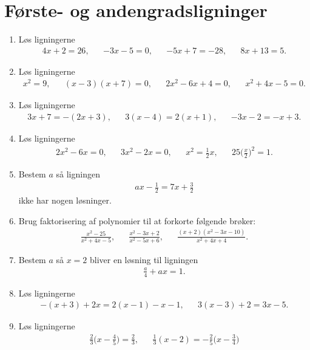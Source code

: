 \section{Første- og andengradsligninger}
\begin{enumerate}
\item Løs ligningerne
\begin{align*}
4x+2=26,&& -3x-5=0,&&-5x+7=-28,&& 8x+13=5.
\end{align*}

\item Løs ligningerne
\begin{align*}
x^2=9,&&(x-3)(x+7)=0,&& 2x^2-6x+4=0,&& x^2+4x-5=0.
\end{align*}

\item Løs ligningerne
\begin{align*}
3x+7=-(2x+3),&& 3(x-4)=2(x+1),&& -3x-2=-x+3.
\end{align*}

\item Løs ligningerne
\begin{align*}
2x^2-6x=0,&& 3x^2-2x=0,&& x^2=\frac{1}{2}x,&& 25\Big(\frac{x}{2}\Big)^2= 1.
\end{align*}

\item Bestem $a$ så ligningen 
\begin{align*}
ax-\frac{1}{2}=7x+\frac{3}{2}
\end{align*}
ikke har nogen løsninger. 

\item Brug faktorisering af polynomier til at forkorte følgende brøker:
\begin{align*}
\frac{x^2-25}{x^2+4x-5},&&\frac{x^2-3x+2}{x^2-5x+6},&& \frac{(x+2)(x^2-3x-10)}{x^2+4x+4}.
\end{align*}

\item Bestem $a$ så $x=2$ bliver en løsning til ligningen
\begin{align*}
\frac{a}{4}+ax=1.
\end{align*}

\item Løs ligningerne
\begin{align*}
-(x+3)+2x=2(x-1)-x-1 ,&& 3(x-3)+2=3x-5.
\end{align*}


\item Løs ligningerne
\begin{align*}
\frac{2}{3}\Big(x- \frac{4}{5}\Big)=\frac{2}{3},&& \frac{1}{3}(x-2)=-\frac{2}{5}\Big(x-\frac{3}{4}\Big)
\end{align*}


\end{enumerate}
